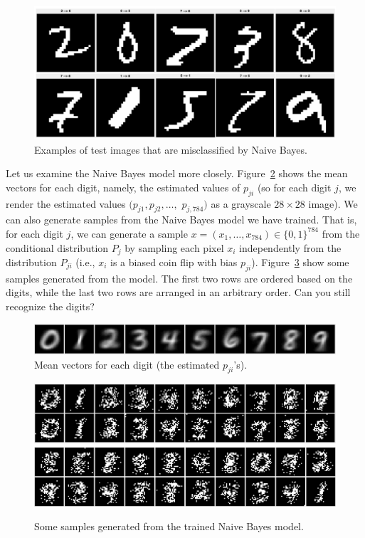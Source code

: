 \documentclass[11pt]{article}
\begin{document}
\begin{figure}[h!]
\centering
\includegraphics[scale=0.4]{naive_mis}
\caption{Examples of test images that are misclassified by Naive Bayes.}
\label{fig:naive_mis}
\end{figure}

Let us examine the Naive Bayes model more closely. Figure~\ref{fig:meannaive} shows the mean vectors for each digit, namely, the estimated values of $p_{ji}$ (so for each digit $j$, we render the estimated values $(p_{j1}, p_{j2}, \dots,$ $p_{j,784})$ as a grayscale $28 \times 28$ image). We can also generate samples from the Naive Bayes model we have trained. That is, for each digit $j$, we can generate a sample $x = (x_1,\dots,x_{784}) \in \{0,1\}^{784}$ from the conditional distribution $P_j$ by sampling each pixel $x_i$ independently from the distribution $P_{ji}$ (i.e., $x_i$ is a biased coin flip with bias $p_{ji}$). Figure~\ref{fig:naivesamples} show some samples generated from the model. The first two rows are ordered based on the digits, while the last two rows are arranged in an arbitrary order. Can you still recognize the digits?


\begin{figure}[h!]
\centering
\includegraphics[scale=0.46]{meannaive}
\caption{Mean vectors for each digit (the estimated $p_{ji}$'s).}
\label{fig:meannaive}
\end{figure}

\begin{figure}[h!]
\centering
\includegraphics[scale=0.4]{naivesamples_ordered} \\
\vspace{4pt}
\includegraphics[scale=0.4]{naivesamples_random}
\caption{Some samples generated from the trained Naive Bayes model.}
\label{fig:naivesamples}
\end{figure}
\end{document}
